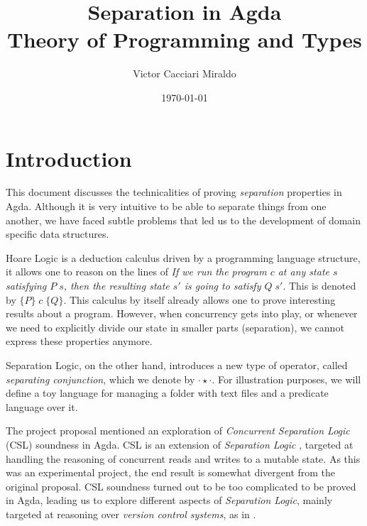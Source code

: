 \documentclass{llncs}
\title{Separation in Agda \\ \small{Theory of Programming and Types}}
\author{Victor Cacciari Miraldo}
\institute{University of Utrecht}
\date{\today}
\begin{document}
\maketitle

\newcommand{\Agda}[1]{\ExecuteMetaData[latex/Excerpts.tex]{#1}}
\newcommand{\PMap}[1]{\ExecuteMetaData[latex/PMapParts.tex]{#1}}


\newcommand{\citeSwierstra}{\cite{Swierstra2014} }
\newcommand{\citeHoare}{\cite{Hoare69} }
\newcommand{\Htriple}[3]{\{ #1 \} \; #2 \; \{ #3 \}}
\newcommand{\fileid}{F_{id}}
\newcommand{\BN}{\mathbb{N}}
\newcommand{\MIM}{\mathcal{M}}


\newcommand{\textSigma}{$\Sigma$}

\section{Introduction}

This document discusses the technicalities of proving \emph{separation} properties in Agda.
Although it is very intuitive to be able to separate things from one another, we have faced
subtle problems that led us to the development of domain specific data structures.

Hoare Logic \citeHoare is a deduction calculus driven by a programming language structure,
it allows one to reason on the lines of \emph{If we run the program $c$ at any state $s$
satisfying $P\;s$, then the resulting state $s'$ is going to satisfy $Q \; s'$}. This is denoted
by $\Htriple{P}{c}{Q}$. This calculus by itself already allows one to prove interesting
results about a program. However, when concurrency gets into play, or whenever we need
to explicitly divide our state in smaller parts (separation), we cannot express these properties anymore.

Separation Logic, on the other hand, introduces a new type of operator, called \emph{separating conjunction}, which
we denote by $\cdot \star \cdot$. For illustration purposes, we will define a toy language for 
managing a folder with text files and a predicate language over it. 

The project proposal mentioned an exploration of \emph{Concurrent Separation Logic} (CSL)
soundness \cite{Vafeiadis2011} in Agda. CSL is an extension of \emph{Separation Logic} \cite{Hearn2001},
targeted at handling the reasoning of concurrent reads and writes to a mutable state. As this
was an experimental project, the end result is somewhat divergent from the original proposal.
CSL soundness turned out to be too complicated to be proved in Agda, leading us to explore
different aspects of \emph{Separation Logic}, mainly targeted at reasoning over \emph{version control systems},
as in \citeSwierstra. 
\end{document}
